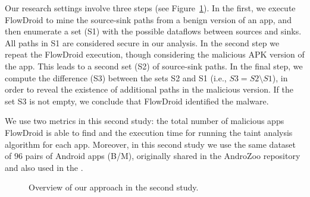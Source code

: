 Our research settings involve three steps (see Figure~\ref{fig:settings2}).
In the first, we execute FlowDroid to mine the source-sink paths from a
benign version of an app, and then enumerate a set (S1) with the 
possible dataflows between sources and sinks. All paths in S1 are considered secure in
our analysis. In the second step we repeat the FlowDroid execution, though
considering the malicious APK version of the app.
This leads to a second set (S2) of source-sink paths. In the final step, we compute the difference (S3) between
the sets S2 and S1 (i.e., $S3 = S2 \setminus S1$), in order to reveal
the existence of additional paths in the
malicious version. If the set S3 is not empty, we conclude that FlowDroid
identified the malware. 


We use two metrics in this second study:
the total number of malicious apps FlowDroid is able to find and the
execution time for running the taint analysis algorithm for each app.
Moreover, in this second study we use the same dataset of $96$ pairs of Android apps (B/M),
originally shared in the AndroZoo repository~\cite{DBLP:conf/msr/AllixBKT16} and
also used in the \blls. 



\begin{figure}
  \caption{Overview of our approach in the second study.}
  \label{fig:settings2}
\end{figure}







